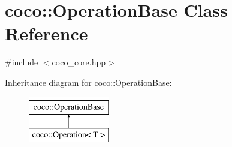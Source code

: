 \hypertarget{classcoco_1_1_operation_base}{}\section{coco\+:\+:Operation\+Base Class Reference}
\label{classcoco_1_1_operation_base}


{\ttfamily \#include $<$coco\+\_\+core.\+hpp$>$}

Inheritance diagram for coco\+:\+:Operation\+Base\+:\begin{figure}[H]
\begin{center}
\leavevmode
\includegraphics[height=2.000000cm]{classcoco_1_1_operation_base}
\end{center}
\end{figure}
